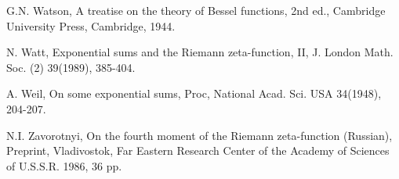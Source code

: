 \begin{thebibliography}{99}
 G.N. Watson, A treatise on the theory of Bessel functions, 2nd ed., Cambridge University Press, Cambridge, 1944.

 N. Watt, Exponential sums and the Riemann zeta-function, II, J. London Math. Soc. (2) 39(1989), 385-404.

 A. Weil, On some exponential sums, Proc, National Acad. Sci. USA 34(1948), 204-207.

 N.I. Zavorotnyi, On the fourth moment of the Riemann zeta-function (Russian), Preprint, Vladivostok, Far Eastern Research Center of the Academy of Sciences of U.S.S.R. 1986, 36 pp.

\end{thebibliography}
